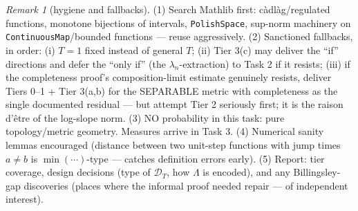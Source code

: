 \documentclass[11pt]{article}
\theoremstyle{plain}
\theoremstyle{remark}
\newtheorem{remark}{Remark}
\newcommand{\D}{\mathcal D}\newcommand{\norm}[1]{\lVert #1\rVert}
\begin{document}
\begin{remark}[hygiene and fallbacks]
(1) Search Mathlib first: c\`adl\`ag/regulated functions, monotone bijections
of intervals, \texttt{PolishSpace}, sup-norm machinery on
\texttt{ContinuousMap}/bounded functions --- reuse aggressively.
(2) Sanctioned fallbacks, in order: (i) $T=1$ fixed instead of general $T$;
(ii) Tier 3(c) may deliver the ``if'' directions and defer the ``only if''
(the $\lambda_n$-extraction) to Task 2 if it resists; (iii) if the
completeness proof's composition-limit estimate genuinely resists, deliver
Tiers 0--1 + Tier 3(a,b) for the SEPARABLE metric with completeness as the
single documented residual --- but attempt Tier 2 seriously first; it is the
raison d'\^etre of the log-slope norm.
(3) NO probability in this task: pure topology/metric geometry. Measures
arrive in Task 3.
(4) Numerical sanity lemmas encouraged (distance between two unit-step
functions with jump times $a\ne b$ is $\min(\cdots)$-type — catches definition
errors early).
(5) Report: tier coverage, design decisions (type of $\D_T$, how $\Lambda$ is
encoded), and any Billingsley-gap discoveries (places where the informal proof
needed repair — of independent interest).
\end{remark}
\end{document}
